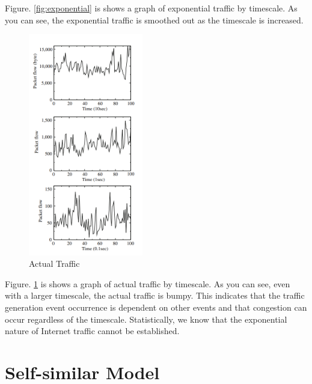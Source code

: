 Figure. \ref{fig:exponential} is shows a graph of exponential traffic by timescale.
As you can see, the exponential traffic is smoothed out as the timescale is increased.
\clearpage
  \begin{figure}[!ht]
    \centering
    \includegraphics[width=5cm]{img/actual.png}
    \caption{Actual Traffic \protect \footnotemark}
    \label{fig:actual}  
  \end{figure}

Figure. \ref{fig:actual} is shows a graph of actual traffic by timescale.
As you can see, even with a larger timescale, the actual traffic is bumpy.
This indicates that the traffic generation event occurrence is dependent on other events and that congestion can occur regardless of the timescale.
Statistically, we know that the exponential nature of Internet traffic cannot be established.\cite{leland1995self}

\section{Self-similar Model}

